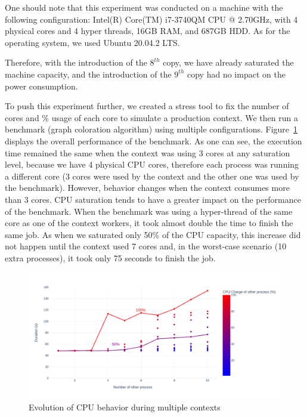 One should note that this experiment was conducted on a machine with the following configuration: Intel(R) Core(TM) i7-3740QM CPU @ 2.70GHz, with 4 physical cores and 4 hyper threads, 16GB RAM, and 687GB HDD.
As for the operating system, we used Ubuntu 20.04.2 LTS.

Therefore, with the introduction of the $8^{th}$ copy, we have already saturated the machine capacity, and the introduction of the $9^{th}$ copy had no impact on the power consumption.

To push this experiment further, we created a stress tool to fix the number of cores and \% usage of each core to simulate a production context.
We then run a benchmark (graph coloration algorithm) using multiple configurations.
Figure~\ref{fig:green_faas_duration} displays the overall performance of the benchmark.
As one can see, the execution time remained the same when the context was using 3 cores at any saturation level, because we have 4 physical CPU cores, therefore each process was running a different core (3 cores were used by the context and the other one was used by the benchmark).
However, behavior changes when the context consumes more than 3 cores.
CPU saturation tends to have a greater impact on the performance of the benchmark.
When the benchmark was using a hyper-thread of the same core as one of the context workers, it took almost double the time to finish the same job.
As when we saturated only 50\% of the CPU capacity, this increase did not happen until the context used 7 cores and, in the worst-case scenario (10 extra processes), it took only 75 seconds to finish the job.

\begin{figure}[!h]
    \centering
    \includegraphics[width=\linewidth]{chapters/green_faas_duration}
    \caption{Evolution of CPU behavior during multiple contexts }
    \label{fig:green_faas_duration}
\end{figure}

